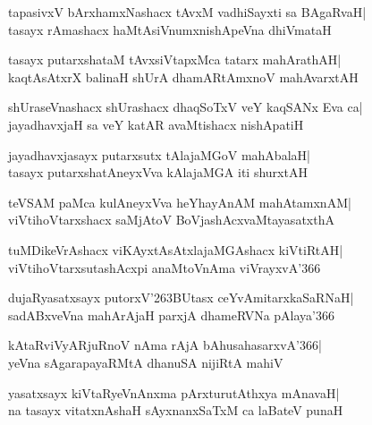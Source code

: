 \documentclass[twoside,12pt,openright]{book}
\def\S{\char'263}
\newcounter{shloka}[chapter]
\begin{document}
\begin{shloka}%
tapasivxV bArxhamxNashacx tAvxM vadhiSayxti sa BAgaRvaH|\\
tasayx rAmashacx haMtAsiVnumxnishApeVna dhiVmataH
\end{shloka}

\begin{shloka}%
tasayx putarxshataM tAvxsiVtapxMca tatarx mahArathAH|\\
kaqtAsAtxrX balinaH shUrA dhamARtAmxnoV mahAvarxtAH
\end{shloka}

\begin{shloka}%
shUraseVnashacx shUrashacx dhaqSoTxV veY kaqSANx Eva ca|\\
jayadhavxjaH sa veY katAR avaMtishacx nishApatiH
\end{shloka}

\begin{shloka}%
jayadhavxjasayx putarxsutx tAlajaMGoV mahAbalaH|\\
tasayx putarxshatAneyxVva kAlajaMGA iti shurxtAH
\end{shloka}

\begin{shloka}%
teVSAM paMca kulAneyxVva heYhayAnAM mahAtamxnAM|\\
viVtihoVtarxshacx saMjAtoV BoVjashAcxvaMtayasatxthA
\end{shloka}

\begin{shloka}%
tuMDikeVrAshacx viKAyxtAsAtxlajaMGAshacx kiVtiRtAH|\\
viVtihoVtarxsutashAcxpi anaMtoVnAma viVrayxvA\char'366
\end{shloka}

\begin{shloka}%
dujaRyasatxsayx putorxV\S BUtasx ceYvAmitarxkaSaRNaH|\\
sadABxveVna mahArAjaH parxjA dhameRVNa pAlaya\char'366
\end{shloka}

\begin{shloka}%
kAtaRviVyARjuRnoV nAma rAjA bAhusahasarxvA\char'366|\\
yeVna sAgarapayaRMtA dhanuSA nijiRtA mahiV
\end{shloka}

\begin{shloka}%
yasatxsayx kiVtaRyeVnAnxma pArxturutAthxya mAnavaH|\\
na tasayx vitatxnAshaH sAyxnanxSaTxM ca laBateV punaH
\end{shloka}
\end{document}

